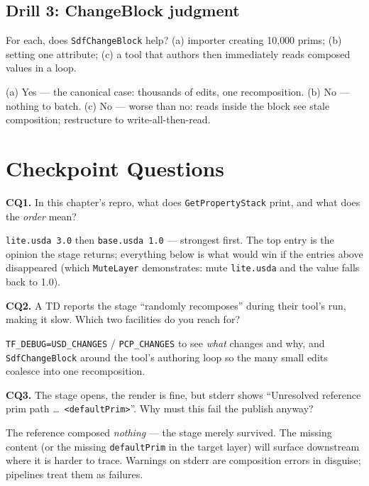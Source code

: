 \subsection*{Drill 3: ChangeBlock judgment}
For each, does \texttt{SdfChangeBlock} help? (a) importer creating 10{,}000
prims; (b) setting one attribute; (c) a tool that authors then immediately
reads composed values in a loop.
\begin{DrillSolution}
(a) Yes --- the canonical case: thousands of edits, one recomposition.
(b) No --- nothing to batch. (c) No --- worse than no: reads inside the
block see stale composition; restructure to write-all-then-read.
\end{DrillSolution}

\section*{Checkpoint Questions}

\noindent\textbf{CQ1.} In this chapter's repro, what does
\texttt{GetPropertyStack} print, and what does the \emph{order} mean?
\begin{DrillSolution}
\texttt{lite.usda 3.0} then \texttt{base.usda 1.0} --- strongest first.
The top entry is the opinion the stage returns; everything below is what
would win if the entries above disappeared (which \texttt{MuteLayer}
demonstrates: mute \texttt{lite.usda} and the value falls back to 1.0).
\end{DrillSolution}

\noindent\textbf{CQ2.} A TD reports the stage ``randomly recomposes'' during
their tool's run, making it slow. Which two facilities do you reach for?
\begin{DrillSolution}
\texttt{TF\_DEBUG=USD\_CHANGES} / \texttt{PCP\_CHANGES} to see \emph{what}
changes and why, and \texttt{SdfChangeBlock} around the tool's authoring
loop so the many small edits coalesce into one recomposition.
\end{DrillSolution}

\noindent\textbf{CQ3.} The stage opens, the render is fine, but stderr shows
``Unresolved reference prim path \ldots\ \texttt{<defaultPrim>}''. Why must
this fail the publish anyway?
\begin{DrillSolution}
The reference composed \emph{nothing} --- the stage merely survived. The
missing content (or the missing \texttt{defaultPrim} in the target layer)
will surface downstream where it is harder to trace. Warnings on stderr are
composition errors in disguise; pipelines treat them as failures.
\end{DrillSolution}

